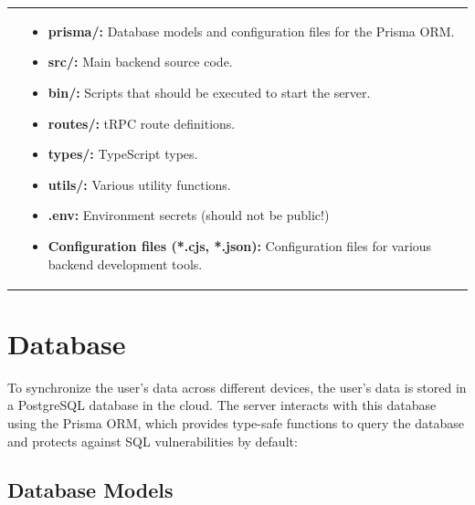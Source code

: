 \documentclass[notitlepage, 12pt]{report}
\begin{document}
\noindent\begin{xltabular}{\textwidth}{
		@{}
		p{0.3\textwidth}
		X
	}
	&
	\begin{itemize}[label={}, leftmargin=5pt]
		\item	\textbf{prisma/:} Database models and configuration files for the Prisma ORM.
		\item	\textbf{src/:} Main backend source code.
		\item	\textbf{bin/:} Scripts that should be executed to start the server.
		\item	\textbf{routes/:} tRPC route definitions.
		\item	\textbf{types/:} TypeScript types.
		\item	\textbf{utils/:} Various utility functions.
		\item	\textbf{.env:} Environment secrets (should not be public!)
		\item	\textbf{Configuration files (*.cjs, *.json):} Configuration files for various backend development tools.
	\end{itemize}
\end{xltabular}

\section*{Database}

To synchronize the user's data across different devices, the user's data is stored in a PostgreSQL database in the cloud. The server interacts with this database using the Prisma ORM, which provides type-safe functions to query the database and protects against SQL vulnerabilities by default:

\subsection*{Database Models}
\end{document}

